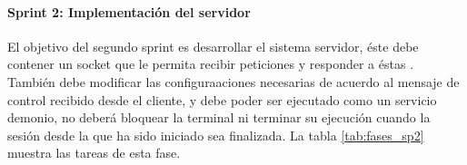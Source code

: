 \documentclass[12pt, twoside]{article}
\begin{document}
        \begin{table}[!htbp]             
            \centering                  
            \caption{Descripción del sprint 1}
            \label{tab:fases_sp1}
        \end{table}

        \paragraph{ Sprint 2: Implementación del servidor}
        El objetivo del segundo sprint es desarrollar el sistema servidor, éste debe contener un socket que le permita recibir peticiones y responder a éstas \cite{Socket}. También debe modificar las configuraaciones necesarias de acuerdo al mensaje de control recibido desde el cliente, y debe poder ser ejecutado como un servicio demonio, no deberá bloquear la terminal ni terminar su ejecución cuando la sesión desde la que ha sido iniciado sea finalizada. La tabla \ref{tab:fases_sp2} muestra las tareas de esta fase.
\end{document}
